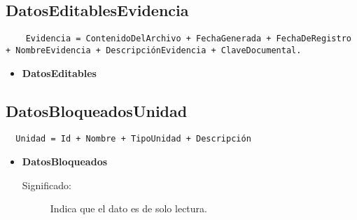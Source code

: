 \subsection{DatosEditablesEvidencia}
\label{dd:Evidencia}
\begin{lstlisting}
    Evidencia = ContenidoDelArchivo + FechaGenerada + FechaDeRegistro + NombreEvidencia + DescripciónEvidencia + ClaveDocumental.
\end{lstlisting}
 \begin{itemize}
  \item \textbf{DatosEditables}
      \begin{description}
        \item 
      \end{description}
\end{itemize}

\subsection{DatosBloqueadosUnidad}
\label{dd:Unidad}
\begin{lstlisting}
  Unidad = Id + Nombre + TipoUnidad + Descripción
\end{lstlisting}

 \begin{itemize}

    \item \textbf{DatosBloqueados}
      \begin{description}
        \item [Significado:] Indica que el dato es de solo lectura.
      \end{description}

\end{itemize}

